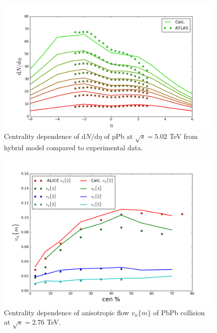 \documentclass[aps,prl,twocolumn,groupedaddress]{revtex4-1}
\begin{document}
	\begin{figure}
  	\centering
	\includegraphics[width=\columnwidth]{pics/RUN-1-pPb-dNdy-eta.png}
	\caption{Centrality dependence of $\mathrm{d}N/\mathrm{d}\eta$ of pPb at $\sqrt{s} = 5.02$ TeV from hybrid model compared to experimental data.}
  	\label{pPb-dNdy-calc}
	\end{figure}
	
	\begin{figure}
  	\centering
	\includegraphics[width=\columnwidth]{pics/new-PbPb-vnm-p1.png}	
	\caption{Centrality dependence of anisotropic flow $v_n\{m\}$ of PbPb collision at $\sqrt{s} = 2.76$ TeV.}
  	\label{PbPb-vn-calc}
	\end{figure}
	
\end{document}
